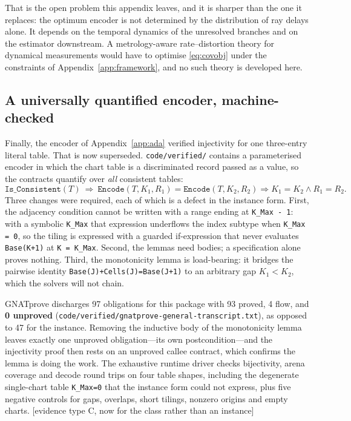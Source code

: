 \documentclass[11pt]{article}
\begin{document}
That is the open problem this appendix leaves, and it is sharper than the one it replaces:
the optimum encoder is not determined by the distribution of ray delays alone. It depends on
the temporal dynamics of the unresolved branches and on the estimator downstream. A
metrology-aware rate--distortion theory for dynamical measurements would have to optimise
\eqref{eq:covobj} under the constraints of Appendix~\ref{app:framework}, and no such theory
is developed here.

\subsection{A universally quantified encoder, machine-checked}

Finally, the encoder of Appendix~\ref{app:ada} verified injectivity for one three-entry
literal table. That is now superseded. \texttt{code/verified/} contains a parameterised
encoder in which the chart table is a discriminated record passed as a value, so the
contracts quantify over \emph{all} consistent tables:
\begin{equation}
\texttt{Is\_Consistent}(T)\ \Longrightarrow\
\texttt{Encode}(T,K_1,R_1)=\texttt{Encode}(T,K_2,R_2)\Rightarrow K_1=K_2\wedge R_1=R_2 .
\end{equation}
Three changes were required, each of which is a defect in the instance form. First, the
adjacency condition cannot be written with a range ending at \texttt{K\_Max - 1}: with a
symbolic \texttt{K\_Max} that expression underflows the index subtype when
\texttt{K\_Max = 0}, so the tiling is expressed with a guarded if-expression that never
evaluates \texttt{Base(K+1)} at \texttt{K = K\_Max}. Second, the lemmas need bodies; a
specification alone proves nothing. Third, the monotonicity lemma is load-bearing: it
bridges the pairwise identity \texttt{Base(J)+Cells(J)=Base(J+1)} to an arbitrary gap
$K_1<K_2$, which the solvers will not chain.

GNATprove discharges 97 obligations for this package with 93 proved, 4 flow, and
\textbf{0 unproved} (\texttt{code/verified/gnatprove-general-transcript.txt}), as opposed to
47 for the instance. Removing the inductive body of the monotonicity lemma leaves exactly
one unproved obligation---its own postcondition---and the injectivity proof then rests on an
unproved callee contract, which confirms the lemma is doing the work. The exhaustive runtime
driver checks bijectivity, arena coverage and decode round trips on four table shapes,
including the degenerate single-chart table \texttt{K\_Max=0} that the instance form could not
express, plus five negative controls for gaps, overlaps, short tilings, nonzero origins and
empty charts. [evidence type C, now for the class rather than an instance]
\end{document}
